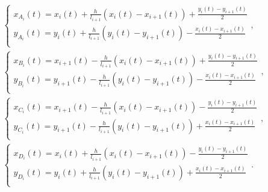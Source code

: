 \documentclass{cumcmthesis}
\begin{document}
    \begin{gather}
    \begin{cases}
    x_{A_i}\left( t \right) =x_i\left( t \right) +\frac{h}{l_{i+1}}\left( x_i\left( t \right) -x_{i+1}\left( t \right) \right) +\frac{y_i\left( t \right) -y_{i+1}\left( t \right)}{2}\\ \label{1.........24}
    y_{A_i}\left( t \right) =y_i\left( t \right) +\frac{h}{l_{i+1}}\left( y_i\left( t \right) -y_{i+1}\left( t \right) \right) -\frac{x_i\left( t \right) -x_{i+1}\left( t \right)}{2}\\ 
    \end{cases},
    \\
    \begin{cases}
    x_{B_i}\left( t \right) =x_{i+1}\left( t \right) -\frac{h}{l_{i+1}}\left( x_i\left( t \right) -x_{i+1}\left( t \right) \right) +\frac{y_i\left( t \right) -y_{i+1}\left( t \right)}{2}\\ \label{1.........26}
    y_{B_i}\left( t \right) =y_{i+1}\left( t \right) -\frac{h}{l_{i+1}}\left( y_i\left( t \right) -y_{i+1}\left( t \right) \right) -\frac{x_i\left( t \right) -x_{i+1}\left( t \right)}{2}\\ 
    \end{cases},
    \\
    \begin{cases}
    x_{C_i}\left( t \right) =x_{i+1}\left( t \right) -\frac{h}{l_{i+1}}\left( x_i\left( t \right) -x_{i+1}\left( t \right) \right) -\frac{y_i\left( t \right) -y_{i+1}\left( t \right)}{2}\\ \label{1.........28}
    y_{C_i}\left( t \right) =y_{i+1}\left( t \right) -\frac{h}{l_{i+1}}\left( y_i\left( t \right) -y_{i+1}\left( t \right) \right) +\frac{x_i\left( t \right) -x_{i+1}\left( t \right)}{2}\\ 
    \end{cases},
    \\
    \begin{cases}
    x_{D_i}\left( t \right) =x_i\left( t \right) +\frac{h}{l_{i+1}}\left( x_i\left( t \right) -x_{i+1}\left( t \right) \right) -\frac{y_i\left( t \right) -y_{i+1}\left( t \right)}{2}\\   \label{1.........30}
    y_{D_i}\left( t \right) =y_i\left( t \right) +\frac{h}{l_{i+1}}\left( y_i\left( t \right) -y_{i+1}\left( t \right) \right) +\frac{x_i\left( t \right) -x_{i+1}\left( t \right)}{2}\\   
    \end{cases}.
    \end{gather}
\end{document}
